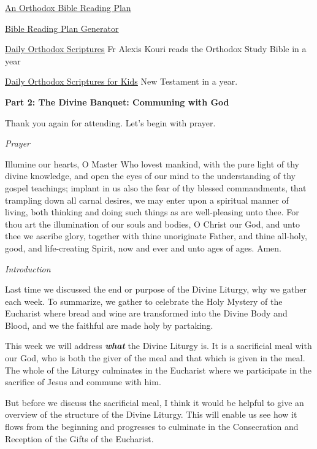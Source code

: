 \documentclass[
]{article}
\begin{document}
\href{https://saintandrew.net/files/Bible\%20Plan/St.-Andrew-Orthodox-Bible-Reading-Plan---Jan-to-Dec.pdf}{\ul{An
Orthodox Bible Reading Plan}}

\href{https://www.biblereadingplangenerator.com/?start=2023-07-01&total=365&format=calendar&order=traditional&daysofweek=1,2,3,4,5,6,7&books=OT,DC,NT&lang=en&logic=words&checkbox=1&colors=0&dailypsalm=0&dailyproverb=0&otntoverlap=0&reverse=0&stats=0&dailystats=0&nodates=0}{\ul{Bible
Reading Plan Generator}}

\href{https://www.ancientfaith.com/podcasts/dailyscriptures}{\ul{Daily
Orthodox Scriptures}} Fr Alexis Kouri reads the Orthodox Study Bible in
a year

\href{https://www.ancientfaith.com/podcasts/dailyscriptureskids}{\ul{Daily
Orthodox Scriptures for Kids}} New Testament in a year.

\textbf{Part 2: The Divine Banquet: Communing with God}

Thank you again for attending. Let's begin with prayer.

\emph{Prayer}

Illumine our hearts, O Master Who lovest mankind, with the pure light of
thy divine knowledge, and open the eyes of our mind to the understanding
of thy gospel teachings; implant in us also the fear of thy blessed
commandments, that trampling down all carnal desires, we may enter upon
a spiritual manner of living, both thinking and doing such things as are
well-pleasing unto thee. For thou art the illumination of our souls and
bodies, O Christ our God, and unto thee we ascribe glory, together with
thine unoriginate Father, and thine all-holy, good, and life-creating
Spirit, now and ever and unto ages of ages. Amen.

\emph{Introduction}

Last time we discussed the end or purpose of the Divine Liturgy, why we
gather each week. To summarize, we gather to celebrate the Holy Mystery
of the Eucharist where bread and wine are transformed into the Divine
Body and Blood, and we the faithful are made holy by partaking.

This week we will address \textbf{\emph{what}} the Divine Liturgy is. It
is a sacrificial meal with our God, who is both the giver of the meal
and that which is given in the meal. The whole of the Liturgy culminates
in the Eucharist where we participate in the sacrifice of Jesus and
commune with him.

But before we discuss the sacrificial meal, I think it would be helpful
to give an overview of the structure of the Divine Liturgy. This will
enable us see how it flows from the beginning and progresses to
culminate in the Consecration and Reception of the Gifts of the
Eucharist.
\end{document}
